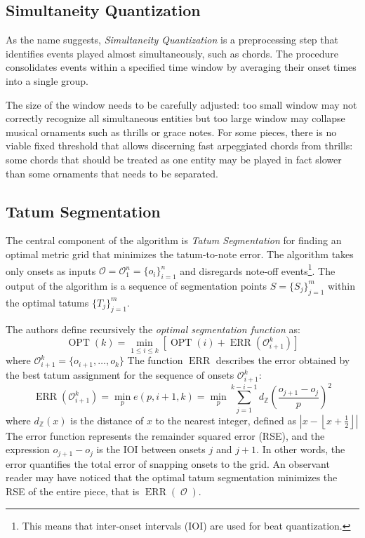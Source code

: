 \subsection{Simultaneity Quantization}

As the name suggests, \emph{Simultaneity Quantization} is a preprocessing step that identifies events played almost simultaneously, such as chords. The procedure consolidates events within a specified time window by averaging their onset times into a single group.

The size of the window needs to be carefully adjusted: too small window may not correctly recognize all simultaneous entities but too large window may collapse musical ornaments such as thrills or grace notes. For some pieces, there is no viable fixed threshold that allows discerning fast arpeggiated chords from thrills: some chords that should be treated as one entity may be played in fact slower than some ornaments that needs to be separated.

\subsection{Tatum Segmentation}

The central component of the algorithm is \emph{Tatum Segmentation} for finding an optimal metric grid that minimizes the tatum-to-note error. The algorithm takes only onsets as inputs $\mathcal{O}=\mathcal{O}_1^n=\{o_i\}_{i=1}^n$ and disregards note-off events\footnote{This means that inter-onset intervals (IOI) are used for beat quantization.}. The output of the algorithm is a sequence of segmentation points $S=\{S_j\}_{j=1}^m$ within the optimal tatums $\{T_j\}_{j=1}^m$.

The authors define recursively the \emph{optimal segmentation function} as: \[\operatorname{OPT}(k) = \min_{1\leq i \leq k}\left[\operatorname{OPT}(i) + \operatorname{ERR}\left(\mathcal{O}_{i+1}^k\right)\right]\] where $\mathcal{O}_{i+1}^k=\{o_{i+1},\ldots,o_k\}$ The function $\operatorname{ERR}$ describes the error obtained by the best tatum assignment for the sequence of onsets $\mathcal{O}_{i+1}^k$: \[\operatorname{ERR}\left(\mathcal{O}_{i+1}^k\right)=\min_p e\left(p,i+1,k\right)=\min_p \sum_{j=1}^{k-i-1}d_{\mathbb{Z}}\left(\frac{o_{j+1}-o_j}{p}\right)^2\] where $d_{\mathbb{Z}}(x)$ is the distance of $x$ to the nearest integer, defined as $\left|x - \left\lfloor x + \tfrac{1}{2}\right\rfloor\right|$ The error function represents the remainder squared error (RSE), and the expression $o_{j+1}-o_j$ is the IOI between onsets $j$ and $j+1$. In other words, the error quantifies the total error of snapping onsets to the grid. An observant reader may have noticed that the optimal tatum segmentation minimizes the RSE of the entire piece, that is $\operatorname{ERR}\left(\operatorname{\mathcal{O}}\right)$.

